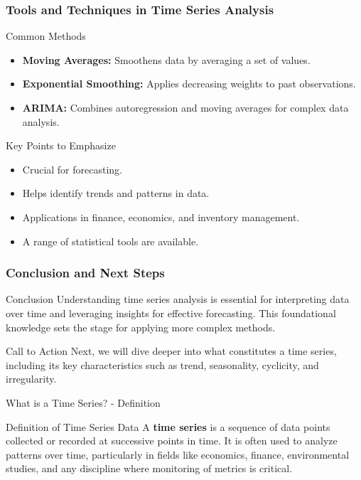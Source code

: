 \documentclass[aspectratio=169]{beamer}
\begin{document}
\begin{frame}[fragile]
    \frametitle{Tools and Techniques in Time Series Analysis}
    \begin{block}{Common Methods}
        \begin{itemize}
            \item \textbf{Moving Averages:} Smoothens data by averaging a set of values.
            \item \textbf{Exponential Smoothing:} Applies decreasing weights to past observations.
            \item \textbf{ARIMA:} Combines autoregression and moving averages for complex data analysis.
        \end{itemize}
    \end{block}
    
    \begin{block}{Key Points to Emphasize}
        \begin{itemize}
            \item Crucial for forecasting.
            \item Helps identify trends and patterns in data.
            \item Applications in finance, economics, and inventory management.
            \item A range of statistical tools are available.
        \end{itemize}
    \end{block}
\end{frame}

\begin{frame}[fragile]
    \frametitle{Conclusion and Next Steps}
    \begin{block}{Conclusion}
        Understanding time series analysis is essential for interpreting data over time and leveraging insights for effective forecasting. This foundational knowledge sets the stage for applying more complex methods.
    \end{block}
    
    \begin{block}{Call to Action}
        Next, we will dive deeper into what constitutes a time series, including its key characteristics such as trend, seasonality, cyclicity, and irregularity.
    \end{block}
\end{frame}

\begin{frame}[fragile]{What is a Time Series? - Definition}
    \begin{block}{Definition of Time Series Data}
        A \textbf{time series} is a sequence of data points collected or recorded at successive points in time. It is often used to analyze patterns over time, particularly in fields like economics, finance, environmental studies, and any discipline where monitoring of metrics is critical.
    \end{block}
\end{frame}
\end{document}
